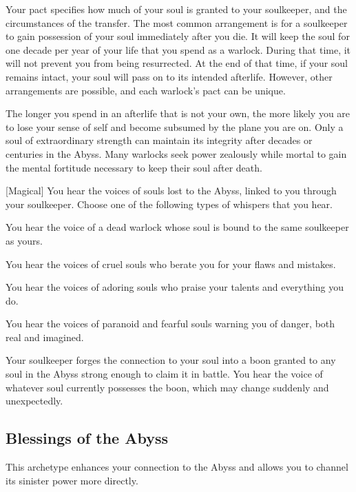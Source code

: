         Your pact specifies how much of your soul is granted to your soulkeeper, and the circumstances of the transfer.
        The most common arrangement is for a soulkeeper to gain possession of your soul immediately after you die.
        It will keep the soul for one decade per year of your life that you spend as a warlock.
        During that time, it will not prevent you from being resurrected.
        At the end of that time, if your soul remains intact, your soul will pass on to its intended afterlife.
        However, other arrangements are possible, and each warlock's pact can be unique.

        The longer you spend in an afterlife that is not your own, the more likely you are to lose your sense of self and become subsumed by the plane you are on.
        Only a soul of extraordinary strength can maintain its integrity after decades or centuries in the Abyss.
        Many warlocks seek power zealously while mortal to gain the mental fortitude necessary to keep their soul after death.

        [Magical]
        You hear the voices of souls lost to the Abyss, linked to you through your soulkeeper.
        Choose one of the following types of whispers that you hear.
        {
             You hear the voice of a dead warlock whose soul is bound to the same soulkeeper as yours.

             You hear the voices of cruel souls who berate you for your flaws and mistakes.

             You hear the voices of adoring souls who praise your talents and everything you do.

             You hear the voices of paranoid and fearful souls warning you of danger, both real and imagined.

             Your soulkeeper forges the connection to your soul into a boon granted to any soul in the Abyss strong enough to claim it in battle.
            You hear the voice of whatever soul currently possesses the boon, which may change suddenly and unexpectedly.
        }

    \subsection{Blessings of the Abyss}
        This archetype enhances your connection to the Abyss and allows you to channel its sinister power more directly.

